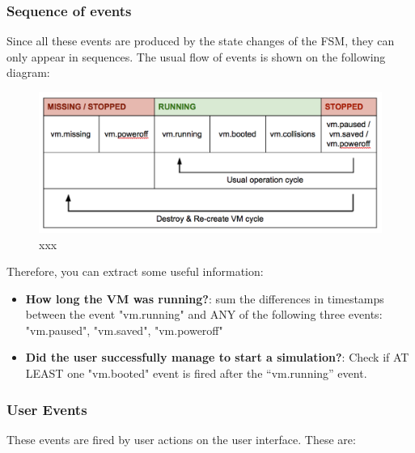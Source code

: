 \documentclass{article}
\begin{document}
\subsubsection{Sequence of events}

Since all these events are produced by the state changes of the FSM, they can only appear in sequences. The usual flow of events is shown on the following diagram:

\begin{figure}[t]
  \begin{center}
		\includegraphics[width=\columnwidth]{imgs/sequenceOfEventsTable.png}
  \end{center}
\caption{xxx}
\label{xxx}
\end{figure}



Therefore, you can extract some useful information:

\begin{itemize}
\item {\bf How long the VM was running?}: sum the differences in timestamps between the event "vm.running" and ANY of the following three events: "vm.paused", "vm.saved", "vm.poweroff"

\item {\bf Did the user successfully manage to start a simulation?}: Check if AT LEAST one "vm.booted" event is fired after the “vm.running” event.
\end{itemize}


\subsubsection{User Events}

These events are fired by user actions on the user interface. These are:
\end{document}
